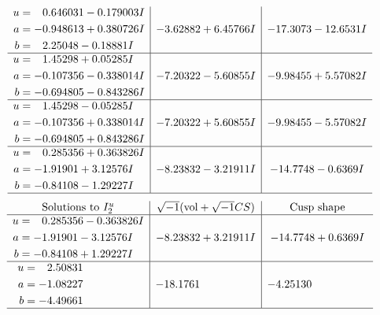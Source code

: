 \documentclass[1p]{elsarticle_modified}
\theoremstyle{definition}
\newcommand{\I}{\sqrt{-1}}
\begin{document}
$$\begin{array}{c|c|c}
\begin{aligned}
u &= \phantom{-}0.646031 - 0.179003 I \\
a &= -0.948613 + 0.380726 I \\
b &= \phantom{-}2.25048 - 0.18881 I\end{aligned}
 & -3.62882 + 6.45766 I & -17.3073 - 12.6531 I \\ \hline\begin{aligned}
u &= \phantom{-}1.45298 + 0.05285 I \\
a &= -0.107356 - 0.338014 I \\
b &= -0.694805 - 0.843286 I\end{aligned}
 & -7.20322 - 5.60855 I & -9.98455 + 5.57082 I \\ \hline\begin{aligned}
u &= \phantom{-}1.45298 - 0.05285 I \\
a &= -0.107356 + 0.338014 I \\
b &= -0.694805 + 0.843286 I\end{aligned}
 & -7.20322 + 5.60855 I & -9.98455 - 5.57082 I \\ \hline\begin{aligned}
u &= \phantom{-}0.285356 + 0.363826 I \\
a &= -1.91901 + 3.12576 I \\
b &= -0.84108 - 1.29227 I\end{aligned}
 & -8.23832 - 3.21911 I & -14.7748 - 0.6369 I\\
 \hline 
 \end{array}$$\newpage$$\begin{array}{c|c|c}  
\text{Solutions to }I^u_{2}& \I (\text{vol} + \sqrt{-1}CS) & \text{Cusp shape}\\
 \hline 
\begin{aligned}
u &= \phantom{-}0.285356 - 0.363826 I \\
a &= -1.91901 - 3.12576 I \\
b &= -0.84108 + 1.29227 I\end{aligned}
 & -8.23832 + 3.21911 I & -14.7748 + 0.6369 I \\ \hline\begin{aligned}
u &= \phantom{-}2.50831\phantom{ +0.000000I} \\
a &= -1.08227\phantom{ +0.000000I} \\
b &= -4.49661\phantom{ +0.000000I}\end{aligned}
 & -18.1761\phantom{ +0.000000I} & -4.25130\phantom{ +0.000000I}\\
 \hline 
 \end{array}$$\newpage\newpage\renewcommand{\arraystretch}{1}
\end{document}
